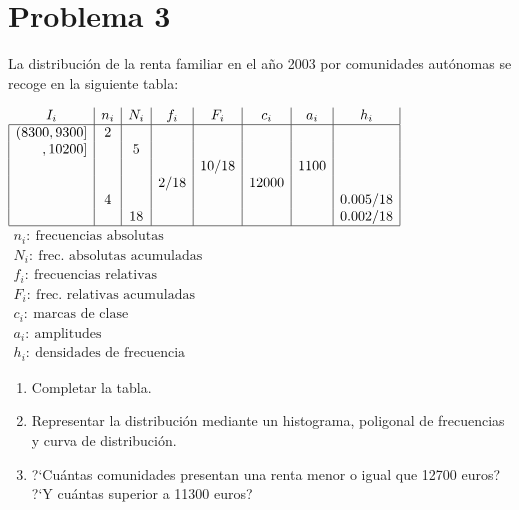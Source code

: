 \documentclass[hidequestions]{homework}
\begin{document}
	\color{black}
	
	
	
	
	\section{Problema 3}
	\color{blue}
	La distribuci{\'o}n de la renta familiar  en el a{\~n}o 2003 por comunidades aut{\'o}nomas se recoge en la
	siguiente tabla:
	
	$\begin{array}{|r|c|c|c|c|c|c|c|}
	\multicolumn{1}{c|}{I_{i}} & n_{i} & N_{i} & f_{i} & F_{i} & c_{i} & a_{i} & h_{i} \\
	\hline
	(8300,9300] & 2 &  &  &  &  &  &  \\
	,10200] &  & 5 &  &  &  &  &  \\
	&  &  &  & 10/18 &  & 1100 &  \\
	&  &  & 2/18 &  & 12000 &  &  \\
	& 4 &  &  &  &  &  & 0\mbox{.}005/18 \\
	&  & 18 &  &  &  &  & 0\mbox{.}002/18 \\  \hline
	\end{array}$ \hskip 1cm $\begin{array}{l}  n_i: \ \mbox{frecuencias absolutas} \\ N_i:  \ \mbox{frec. absolutas acumuladas}\\ f_i:  \ \mbox{frecuencias relativas}
	\\ F_i:  \ \mbox{frec. relativas acumuladas}\\ c_i:  \ \mbox{marcas de clase}\\ a_i:  \ \mbox{amplitudes} \\ h_i:  \ \mbox{densidades de frecuencia}\end{array}$
	\begin{enumerate}
		\item Completar la tabla.
		\item Representar la distribuci{\'o}n mediante un histograma,
		poligonal de frecuencias y curva de distribuci{\'o}n.
		\item ?`Cu{\'a}ntas comunidades presentan una renta menor o igual
		que 12700 euros? ?`Y cu{\'a}ntas superior a 11300 euros? \\
	\end{enumerate}
	
	\color{black}
	
	
	
	
\end{document}
